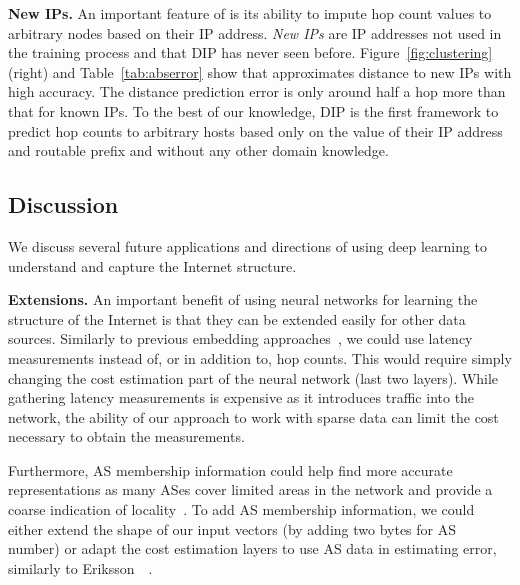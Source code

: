 \textbf{New IPs.} An important feature of \system{} is its ability to impute hop count values to arbitrary nodes based on their IP address. %
{\em New IPs} are IP addresses not used in the training process and that DIP has never seen before.
Figure~\ref{fig:clustering} (right) and Table~\ref{tab:abserror} show that \system{} approximates distance to new IPs with high accuracy. The distance prediction error is only around half a hop more than that for known IPs. To the best of our knowledge, DIP is the first framework to predict hop counts to arbitrary hosts based only on the value of their IP address and routable prefix and without any other domain knowledge.


\subsection{Discussion}
\label{dip:discussion}

We discuss several future applications and directions of using deep learning to understand and capture the Internet structure.

\textbf{Extensions.} An important benefit of using neural networks for learning the structure of the Internet is that they can be extended easily for other data sources. 
%
Similarly to previous embedding approaches~\citep{vivaldi,gnp}, we could use latency measurements instead of, or in addition to, hop counts. This would require simply changing the cost estimation part of the neural network (last two layers). While gathering latency measurements is expensive as it introduces traffic into the network, the ability of our approach to work with sparse data can limit the cost necessary to obtain the measurements. 

Furthermore, AS membership information could help find more accurate representations as many ASes cover limited areas in the network and provide a coarse indication of locality~\citep{barford-infocom}. To add AS membership information, we could either extend the shape of our input vectors (by adding two bytes for AS number) or adapt the cost estimation layers to use AS data in estimating error, similarly to Eriksson~\etal~\citep{barford-infocom}.


